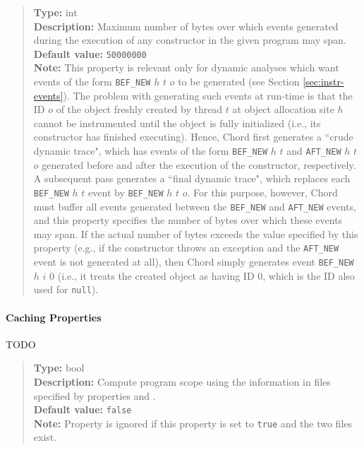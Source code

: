 \begin{quote}
{\bf Type:} int \\
{\bf Description:} Maximum number of bytes over which events generated during the execution of any constructor in the given program may span. \\
{\bf Default value:} {\tt 50000000} \\
{\bf Note:} This property is relevant only for dynamic analyses which want events of the form {\tt BEF\_NEW} $h$ $t$ $o$ to be generated (see Section \ref{sec:instr-events}).  The problem with generating such events at run-time is that the ID $o$ of the object freshly created by thread $t$ at object allocation site $h$ cannot be instrumented until the object is fully initialized (i.e., its constructor has finished executing).  Hence, Chord first generates a ``crude dynamic trace", which has events of the form {\tt BEF\_NEW} $h$ $t$ and {\tt AFT\_NEW} $h$ $t$ $o$ generated before and after the execution of the constructor, respectively.  A subsequent pass generates a ``final dynamic trace", which replaces each {\tt BEF\_NEW} $h$ $t$ event by {\tt BEF\_NEW} $h$ $t$ $o$.  For this purpose, however, Chord must buffer all events generated between the {\tt BEF\_NEW} and {\tt AFT\_NEW} events, and this property specifies the number of bytes over which these events may span.  If the actual number of bytes exceeds the value specified by this property (e.g., if the constructor throws an exception and the {\tt AFT\_NEW} event is not generated at all), then Chord simply generates event {\tt BEF\_NEW} $h$ $i$ $0$ (i.e., it treats the created object as having ID 0, which is the ID also used for {\tt null}). 
\end{quote}

\paragraph{Caching Properties}

TODO

\begin{quote}
{\bf Type:} bool \\
{\bf Description:} Compute program scope using the information in files specified by properties  and . \\
{\bf Default value:} {\tt false} \\
{\bf Note:} Property  is ignored if this property is set to {\tt true} and the two files exist. 
\end{quote}

